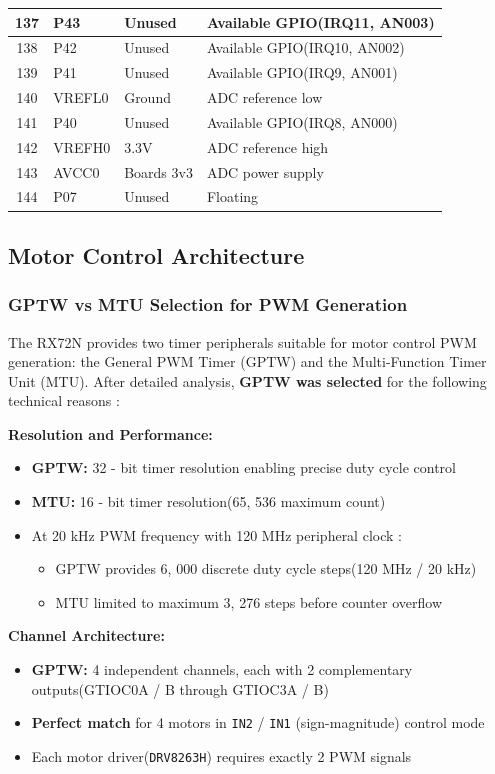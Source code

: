 \begin{longtable} { | c | l | l | p{5cm} |}
\hline
137 & P43 & Unused &Available GPIO(IRQ11, AN003) \\
\hline
138 & P42 & Unused &Available GPIO(IRQ10, AN002) \\
\hline
139 & P41 & Unused &Available GPIO(IRQ9, AN001) \\
\hline
\rowcolor{gray!15}
140 & VREFL0 & Ground &ADC reference low \\
\hline
141 & P40 & Unused &Available GPIO(IRQ8, AN000) \\
\hline
\rowcolor{gray!15}
142 & VREFH0 & 3.3V & ADC reference high \\
\hline
\rowcolor{gray!15}
143 & AVCC0 &Boards 3v3 & ADC power supply \\
\hline
144 & P07 & Unused & Floating \\
\hline
\end{longtable}

\subsection{Motor Control Architecture}

\subsubsection{GPTW vs MTU Selection for PWM Generation
}

The RX72N provides two timer peripherals suitable for motor control PWM generation: the General PWM Timer (GPTW) and the Multi-Function Timer Unit (MTU). After detailed analysis, \textbf{GPTW was selected
} for
  the following technical reasons :

\textbf{Resolution and Performance:
 }
\begin{itemize}
\item \textbf{GPTW:
}
32 - bit timer resolution enabling precise duty cycle control
    \item \textbf{MTU:
}
16 - bit timer resolution(65, 536 maximum count)
    \item At 20 kHz PWM frequency with 120 MHz peripheral clock :
    \begin{itemize}
\item GPTW provides 6, 000 discrete duty cycle steps(120 MHz / 20 kHz)
        \item MTU limited to maximum 3, 276 steps before counter overflow
    \end{itemize}
\end{itemize}

\textbf{Channel Architecture:}
\begin{itemize}
\item \textbf{GPTW:
}
4 independent channels,
    each with 2 complementary outputs(GTIOC0A / B through GTIOC3A / B)
    \item \textbf{Perfect match
} for
4 motors in \texttt{IN2} / \texttt{IN1} (sign-magnitude) control mode
    \item Each motor driver(\texttt{DRV8263H})
      requires exactly 2
    PWM signals
\end{itemize}

